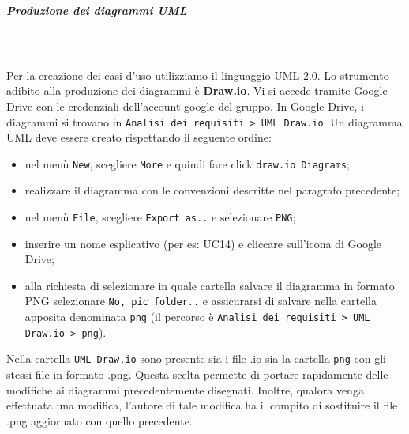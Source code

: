 			
			\subparagraph{Produzione dei diagrammi UML} \mbox{}\\ \mbox{}\\
			Per la creazione dei casi d'uso utilizziamo il linguaggio UML 2.0.
			Lo strumento adibito alla produzione dei diagrammi è \textbf{Draw.io}.
			Vi si accede tramite Google Drive con le credenziali dell'account google del gruppo.
			In Google Drive, i diagrammi si trovano in \texttt{Analisi dei requisiti > UML Draw.io}.
			Un diagramma UML deve essere creato rispettando il seguente ordine:
			\begin{itemize}
				\item nel menù \texttt{New}, scegliere \texttt{More} e quindi fare
				click \texttt{draw.io Diagrams};
				\item realizzare il diagramma con le convenzioni descritte nel paragrafo precedente; 
				\item nel menù \texttt{File}, scegliere \texttt{Export as..} e selezionare \texttt{PNG};
				\item inserire un nome esplicativo (per es: UC14) e cliccare sull'icona di
				Google Drive;
				\item alla richiesta di selezionare in quale cartella salvare il diagramma 
				in formato PNG selezionare \texttt{No, pic folder..} e assicurarsi di salvare 
				nella cartella apposita denominata \texttt{png} (il percorso è 
				\texttt{Analisi dei requisiti > UML Draw.io > png}).
			\end{itemize}
			Nella cartella \texttt{UML Draw.io} sono presente sia i file .io sia la cartella \texttt{png}
			con gli stessi file in formato .png.
			Questa scelta permette di portare rapidamente delle modifiche ai diagrammi precedentemente disegnati.
			Inoltre, qualora venga effettuata una modifica, l'autore di tale modifica ha il compito di 
			sostituire il file .png aggiornato con quello precedente. 
			
